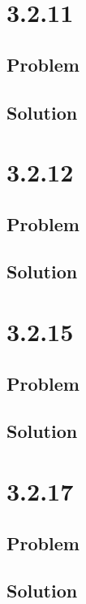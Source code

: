 \documentclass[12pt]{article}
\begin{document}
\section*{3.2.11}

\subsection*{Problem}

\subsection*{Solution}



\section*{3.2.12}

\subsection*{Problem}

\subsection*{Solution}



\section*{3.2.15}

\subsection*{Problem}

\subsection*{Solution}



\section*{3.2.17}

\subsection*{Problem}

\subsection*{Solution}
\end{document}
